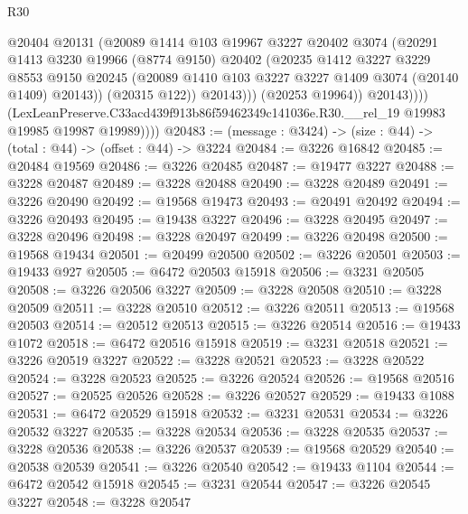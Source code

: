 \begin{lexlean}{R30}
\begin{coremodule}
                        @20404
                        @20131
                        (@20089
                          @1414
                          @103
                          @19967
                          @3227
                          @20402
                          @3074
                          (@20291
                            @1413
                            @3230
                            @19966
                            (@8774 @9150)
                            @20402
                            (@20235
                              @1412
                              @3227
                              @3229
                              @8553
                              @9150
                              @20245
                              (@20089 @1410 @103 @3227 @3227 @1409 @3074 (@20140 @1409) @20143))
                            (@20315 @122))
                          @20143)))
                    (@20253 @19964))
                  @20143))))
          (LexLeanPreserve.C33acd439f913b86f59462349c141036e.R30.__rel_19
            @19983
            @19985
            @19987
            @19989))))
@20483 := (message : @3424) -> (size : @44) -> (total : @44) -> (offset : @44) -> @3224
@20484 := @3226 @16842
@20485 := @20484 @19569
@20486 := @3226 @20485
@20487 := @19477 @3227
@20488 := @3228 @20487
@20489 := @3228 @20488
@20490 := @3228 @20489
@20491 := @3226 @20490
@20492 := @19568 @19473
@20493 := @20491 @20492
@20494 := @3226 @20493
@20495 := @19438 @3227
@20496 := @3228 @20495
@20497 := @3228 @20496
@20498 := @3228 @20497
@20499 := @3226 @20498
@20500 := @19568 @19434
@20501 := @20499 @20500
@20502 := @3226 @20501
@20503 := @19433 @927
@20505 := @6472 @20503 @15918
@20506 := @3231 @20505
@20508 := @3226 @20506 @3227
@20509 := @3228 @20508
@20510 := @3228 @20509
@20511 := @3228 @20510
@20512 := @3226 @20511
@20513 := @19568 @20503
@20514 := @20512 @20513
@20515 := @3226 @20514
@20516 := @19433 @1072
@20518 := @6472 @20516 @15918
@20519 := @3231 @20518
@20521 := @3226 @20519 @3227
@20522 := @3228 @20521
@20523 := @3228 @20522
@20524 := @3228 @20523
@20525 := @3226 @20524
@20526 := @19568 @20516
@20527 := @20525 @20526
@20528 := @3226 @20527
@20529 := @19433 @1088
@20531 := @6472 @20529 @15918
@20532 := @3231 @20531
@20534 := @3226 @20532 @3227
@20535 := @3228 @20534
@20536 := @3228 @20535
@20537 := @3228 @20536
@20538 := @3226 @20537
@20539 := @19568 @20529
@20540 := @20538 @20539
@20541 := @3226 @20540
@20542 := @19433 @1104
@20544 := @6472 @20542 @15918
@20545 := @3231 @20544
@20547 := @3226 @20545 @3227
@20548 := @3228 @20547

\end{coremodule}
\end{lexlean}
